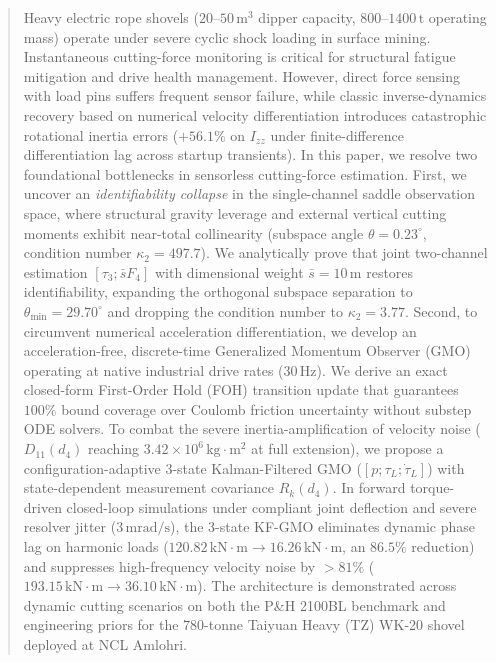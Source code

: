 \documentclass[journal]{IEEEtran}
\begin{document}
\begin{abstract}
Heavy electric rope shovels ($20\text{--}50\,\mathrm{m^3}$ dipper capacity, $800\text{--}1400\,\mathrm{t}$ operating mass) operate under severe cyclic shock loading in surface mining. Instantaneous cutting-force monitoring is critical for structural fatigue mitigation and drive health management. However, direct force sensing with load pins suffers frequent sensor failure, while classic inverse-dynamics recovery based on numerical velocity differentiation introduces catastrophic rotational inertia errors ($+56.1\%$ on $I_{zz}$ under finite-difference differentiation lag across startup transients). In this paper, we resolve two foundational bottlenecks in sensorless cutting-force estimation. First, we uncover an \emph{identifiability collapse} in the single-channel saddle observation space, where structural gravity leverage and external vertical cutting moments exhibit near-total collinearity (subspace angle $\theta = 0.23^\circ$, condition number $\kappa_2 = 497.7$). We analytically prove that joint two-channel estimation $[\tau_3; \bar{s} F_4]$ with dimensional weight $\bar{s} = 10\,\mathrm{m}$ restores identifiability, expanding the orthogonal subspace separation to $\theta_{\min} = 29.70^\circ$ and dropping the condition number to $\kappa_2 = 3.77$. Second, to circumvent numerical acceleration differentiation, we develop an acceleration-free, discrete-time Generalized Momentum Observer (GMO) operating at native industrial drive rates ($30\,\mathrm{Hz}$). We derive an exact closed-form First-Order Hold (FOH) transition update that guarantees $100\%$ bound coverage over Coulomb friction uncertainty without substep ODE solvers. To combat the severe inertia-amplification of velocity noise ($D_{11}(d_4)$ reaching $3.42\times 10^6\,\mathrm{kg\cdot m^2}$ at full extension), we propose a configuration-adaptive 3-state Kalman-Filtered GMO ($[p; \tau_L; \dot{\tau}_L]$) with state-dependent measurement covariance $R_k(d_4)$. In forward torque-driven closed-loop simulations under compliant joint deflection and severe resolver jitter ($3\,\mathrm{mrad/s}$), the 3-state KF-GMO eliminates dynamic phase lag on harmonic loads ($120.82\,\mathrm{kN\cdot m} \to 16.26\,\mathrm{kN\cdot m}$, an $86.5\%$ reduction) and suppresses high-frequency velocity noise by $>81\%$ ($193.15\,\mathrm{kN\cdot m} \to 36.10\,\mathrm{kN\cdot m}$). The architecture is demonstrated across dynamic cutting scenarios on both the P\&H 2100BL benchmark and engineering priors for the 780-tonne Taiyuan Heavy (TZ) WK-20 shovel deployed at NCL Amlohri.
\end{abstract}
\end{document}
